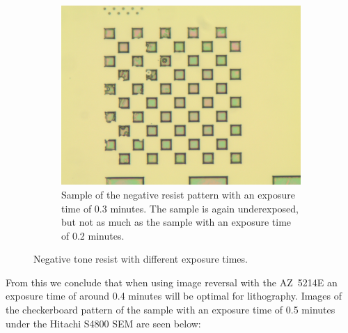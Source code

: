 \begin{figure}[ht]
\begin{subfigure}[t]{0.3\linewidth}
	\label{fig:b2h1}
    \end{subfigure}
    \hfill
    \begin{subfigure}[t]{0.3\linewidth}
        \centering
        \includegraphics[width=\textwidth]{data/b2i1.jpg}
	\caption{Sample of the negative resist pattern with an exposure time of 0.3 minutes. The sample is again underexposed, but not as much as the sample with an exposure time of 0.2 minutes.}
	\label{fig:b2i1}
    \end{subfigure}
    \hfill
    \caption{Negative tone resist with different exposure times.}
\end{figure}



From this we conclude that when using image reversal with the AZ~5214E an exposure time of around 0.4 minutes will be optimal for lithography. Images of the checkerboard pattern of the sample with an exposure time of 0.5 minutes under the Hitachi S4800 SEM are seen below:


